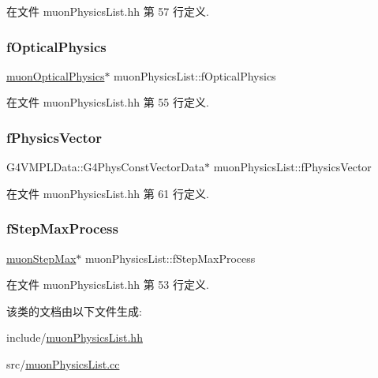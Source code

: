 在文件 muon\+Physics\+List.\+hh 第 57 行定义.

\mbox{\label{classmuonPhysicsList_acb5e214bd52e011594ae48fcc42f0e34}} 
\subsubsection{\texorpdfstring{f\+Optical\+Physics}{fOpticalPhysics}}
{\footnotesize\ttfamily \hyperlink{classmuonOpticalPhysics}{muon\+Optical\+Physics}$\ast$ muon\+Physics\+List\+::f\+Optical\+Physics\hspace{0.3cm}{\ttfamily [private]}}



在文件 muon\+Physics\+List.\+hh 第 55 行定义.

\mbox{\label{classmuonPhysicsList_a6c077ba5278ee28a73980a27ec2feab9}} 
\subsubsection{\texorpdfstring{f\+Physics\+Vector}{fPhysicsVector}}
{\footnotesize\ttfamily G4\+V\+M\+P\+L\+Data\+::\+G4\+Phys\+Const\+Vector\+Data$\ast$ muon\+Physics\+List\+::f\+Physics\+Vector\hspace{0.3cm}{\ttfamily [private]}}



在文件 muon\+Physics\+List.\+hh 第 61 行定义.

\mbox{\label{classmuonPhysicsList_a912f1109082e28c27ee5eecd492fe004}} 
\subsubsection{\texorpdfstring{f\+Step\+Max\+Process}{fStepMaxProcess}}
{\footnotesize\ttfamily \hyperlink{classmuonStepMax}{muon\+Step\+Max}$\ast$ muon\+Physics\+List\+::f\+Step\+Max\+Process\hspace{0.3cm}{\ttfamily [private]}}



在文件 muon\+Physics\+List.\+hh 第 53 行定义.



该类的文档由以下文件生成\+:\begin{DoxyCompactItemize}
\item 
include/\hyperlink{muonPhysicsList_8hh}{muon\+Physics\+List.\+hh}\item 
src/\hyperlink{muonPhysicsList_8cc}{muon\+Physics\+List.\+cc}\end{DoxyCompactItemize}
